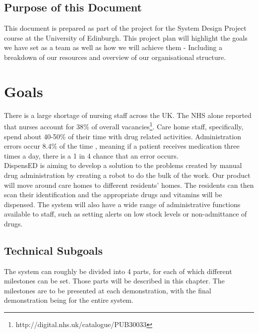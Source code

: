 \documentclass[a4paper,10pt,DIV10,openright,openbib]{scrreprt}
\begin{document}
\section{Purpose of this Document}
This document is prepared as part of the project for the System Design Project course
at the University of Edinburgh. This project plan will highlight the goals we
have set as a team as well as how we will achieve them - Including a breakdown
of our resources and overview of our organisational structure.
\vspace{2cm}
{\let\clearpage\relax  \chapter{Goals}}

There is a large shortage of nursing staff across the UK. The NHS alone reported
that nurses account for 38\% of overall vacancies\footnote{http://digital.nhs.uk/catalogue/PUB30033}.
Care home staff, specifically, spend about 40-50\% of their time with drug
related activities. Administration errors occur 8.4\% of the time \cite{CHUMS},
meaning if a patient receives medication three times a day, there is a 1 in 4
chance that an error occurs.\\
DispensED is aiming to develop a solution to the problems created by manual drug
administration by creating a robot to do the bulk of the work. Our product will
move around care homes to different residents' homes. The residents can then
scan their identification and the appropriate drugs and vitamins will be
dispensed. The system will also have a wide range of administrative functions
available to staff, such as setting alerts on low stock levels or non-admittance of drugs.

\section{Technical Subgoals}
The system can roughly be divided into 4 parts, for each of which different milestones
can be set. Those parts will be described in this chapter. The milestones are to be
presented at each demonstration, with the final demonstration being for the entire
system.
\end{document}

